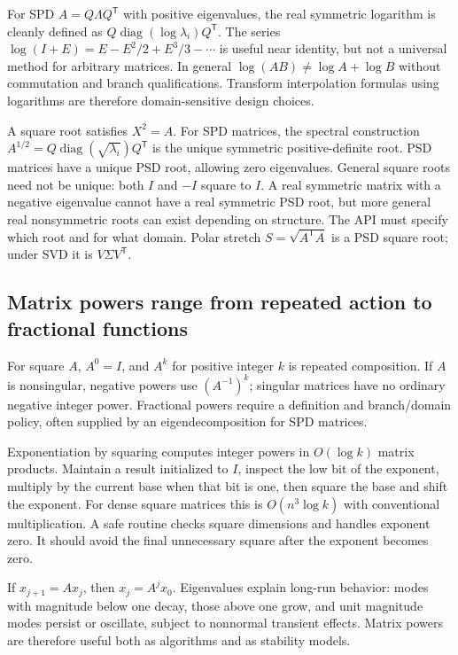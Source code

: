For SPD \(A=Q\Lambda Q^\mathsf T\) with positive eigenvalues, the real symmetric logarithm is cleanly defined as \(Q\operatorname{diag}(\log\lambda_i)Q^\mathsf T\). The series \(\log(I+E)=E-E^2/2+E^3/3-\cdots\) is useful near identity, but not a universal method for arbitrary matrices. In general \(\log(AB)\ne\log A+\log B\) without commutation and branch qualifications. Transform interpolation formulas using logarithms are therefore domain-sensitive design choices.

A square root satisfies \(X^2=A\). For SPD matrices, the spectral construction \(A^{1/2}=Q\operatorname{diag}(\sqrt{\lambda_i})Q^\mathsf T\) is the unique symmetric positive-definite root. PSD matrices have a unique PSD root, allowing zero eigenvalues. General square roots need not be unique: both \(I\) and \(-I\) square to \(I\). A real symmetric matrix with a negative eigenvalue cannot have a real symmetric PSD root, but more general real nonsymmetric roots can exist depending on structure. The API must specify which root and for what domain. Polar stretch \(S=\sqrt{A^\mathsf TA}\) is a PSD square root; under SVD it is \(V\Sigma V^\mathsf T\).

\subsection{Matrix powers range from repeated action to fractional functions}\label{matrix-powers-range-from-repeated-action-to-fractional-functions}

For square \(A\), \(A^0=I\), and \(A^k\) for positive integer \(k\) is repeated composition. If \(A\) is nonsingular, negative powers use \((A^{-1})^k\); singular matrices have no ordinary negative integer power. Fractional powers require a definition and branch/domain policy, often supplied by an eigendecomposition for SPD matrices.

Exponentiation by squaring computes integer powers in \(O(\log k)\) matrix products. Maintain a result initialized to \(I\), inspect the low bit of the exponent, multiply by the current base when that bit is one, then square the base and shift the exponent. For dense square matrices this is \(O(n^3\log k)\) with conventional multiplication. A safe routine checks square dimensions and handles exponent zero. It should avoid the final unnecessary square after the exponent becomes zero.

If \(x_{j+1}=Ax_j\), then \(x_j=A^jx_0\). Eigenvalues explain long-run behavior: modes with magnitude below one decay, those above one grow, and unit magnitude modes persist or oscillate, subject to nonnormal transient effects. Matrix powers are therefore useful both as algorithms and as stability models.

